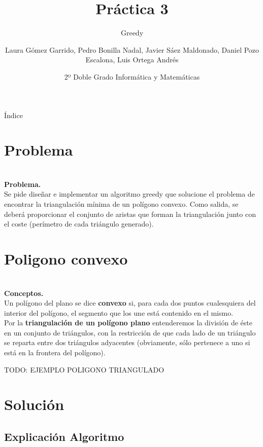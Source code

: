 \documentclass[compress]{beamer}
\title{Práctica 3}                                               %
\subtitle{Greedy}                                  %
\author{Laura Gómez Garrido, Pedro Bonilla Nadal, Javier Sáez Maldonado, Daniel Pozo Escalona, Luis Ortega Andrés}
\date{2º Doble Grado Informática y Matemáticas}                                                            %
\begin{document}
\begin{frame}
\titlepage
\end{frame}

\begin{frame}{Índice}
  \hypertarget{index}{}
  \tableofcontents
  
\end{frame}

\section{Problema}
\begin{frame}

\textbf{\\Problema.\\}
	Se pide diseñar e implementar un algoritmo greedy que solucione el problema de encontrar la triangulación mínima de un polígono convexo. Como salida, se deberá proporcionar el conjunto de aristas que forman la triangulación junto con el coste (perímetro de cada triángulo generado).

\end{frame}	

\section{Poligono convexo}
\begin{frame}
	
	\textbf{\\Conceptos.\\}
Un polígono del plano se dice \textbf{convexo} si, para cada dos puntos cualesquiera del interior del polígono, el segmento que los une está contenido en el mismo. \\
Por la \textbf{triangulación de un polígono plano} entenderemos la división de éste en un conjunto de triángulos, con la restricción de que cada lado de un triángulo se reparta entre dos triángulos adyacentes (obviamente, sólo pertenece a uno si está en la frontera del polígono).
	
	TODO: EJEMPLO POLIGONO TRIANGULADO
\end{frame}	
	
\section{Solución}

\subsection{Explicación Algoritmo}
\end{document}
